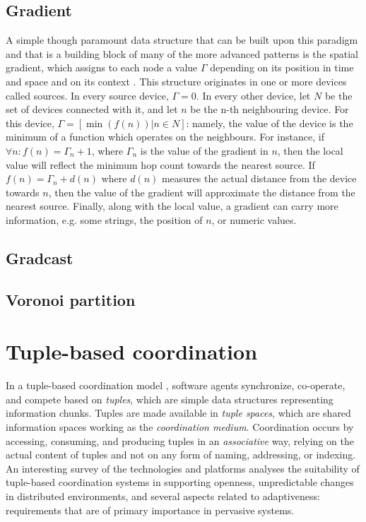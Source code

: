 \documentclass[12pt,a4paper,twoside,openright]{book}
\begin{document}

\subsection{Gradient}
\label{gradient}
A simple though paramount data structure that can be built upon this paradigm and that is a building block of many of the more advanced patterns is the spatial gradient, which assigns to each node a value $\varGamma$ depending on its position in time and space and on its context \cite{mamei2009acm,crf,VCMZ-TAAS2011}.
%
This structure originates in one or more devices called sources.
%
In every source device, $\varGamma=0$.
%
In every other device, let $N$ be the set of devices connected with it, and let $n$ be the n-th neighbouring device.
%
For this device, $\varGamma=[\min(f(n)) | n \in N]$: namely, the value of the device is the minimum of a function which operates on the neighbours.
%
For instance, if $ \forall n \colon f(n)=\varGamma_{n}+1$, where $\varGamma_{n}$ is the value of the gradient in $n$, then the local value will reflect the minimum hop count towards the nearest source.
%
If $f(n) = \varGamma_{n} +d(n)$ where $d(n)$ measures the actual distance from the device towards $n$, then the value of the gradient will approximate the distance from the nearest source.
%
Finally, along with the local value, a gradient can carry more information, e.g. some strings, the position of $n$, or numeric values.

\cite{crf}

\subsection{Gradcast}

\subsection{Voronoi partition}

\section{Tuple-based coordination}

In a tuple-based coordination model \cite{coordbook2001--ch04}, software agents synchronize, co-operate, and compete based on \emph{tuples}, which are simple data structures representing information chunks.
%
Tuples are made available in \emph{tuple spaces}, which are shared information spaces working as the \emph{coordination medium}.
%
Coordination occurs by accessing, consuming, and producing tuples in an \emph{associative} way, relying on the actual content of tuples and not on any form of naming, addressing, or indexing.
%
An interesting survey of the technologies and platforms \cite{adaptivenesslinda-esoaI} analyses the suitability of tuple-based coordination systems in supporting openness, unpredictable changes in distributed environments, and several aspects related to adaptiveness: requirements that are of primary importance in pervasive systems.
\end{document}
